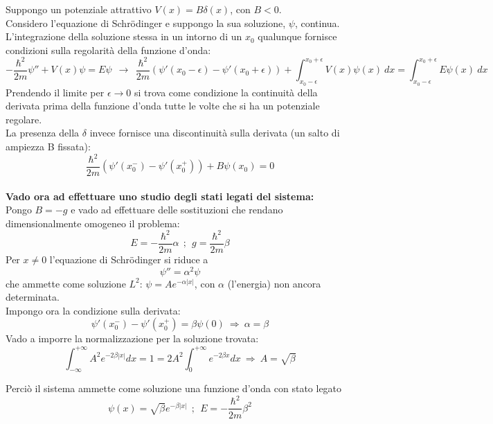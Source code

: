 \documentclass[twoside]{article}
\begin{document}
Suppongo un potenziale attrattivo $V(x)=B\delta(x)$, con $B<0$.
\\
Considero l'equazione di Schr\"odinger e suppongo la sua soluzione, $\psi$, continua. L'integrazione della soluzione stessa in un intorno di un $x_0$ qualunque fornisce condizioni sulla regolarità della funzione d'onda:
\begin{equation}
    -\frac{\hbar^2}{2m}\psi'' +V(x)\psi=E\psi \ \ \rightarrow \ \  \frac{\hbar^2}{2m}(\psi'(x_0-\epsilon)-\psi'(x_0+\epsilon)) +\int_{x_0-\epsilon}^{x_0+\epsilon}V(x)\psi(x) \ dx= \int_{x_0-\epsilon}^{x_0+\epsilon}E\psi(x) \ dx 
\end{equation}
Prendendo il limite per $\epsilon \rightarrow 0$ si trova come condizione la continuità della derivata prima della funzione d'onda tutte le volte che si ha un potenziale regolare.
\\
La presenza della $\delta$ invece fornisce una discontinuità sulla derivata (un salto di ampiezza B fissata):
\begin{equation}
    \frac{\hbar^2}{2m}(\psi'(x_0 ^-)-\psi'(x_0 ^+)) + B\psi(x_0)=0
\end{equation}
\\
\textbf{Vado ora ad effettuare uno studio degli stati legati del sistema:}
\\
Pongo $B=-g$ e vado ad effettuare delle sostituzioni che rendano dimensionalmente omogeneo il problema:
\begin{equation}
    E=-\frac{\hbar^2}{2m}\alpha \ \ ; \ \ g=\frac{\hbar^2}{2m}\beta
\end{equation}
Per $x\neq0$ l'equazione di Schr\"odinger si riduce a 
\begin{equation}
    \psi''=\alpha^2\psi
\end{equation}
che ammette come soluzione $L^2$: $\psi=Ae^{-\alpha|x|}$, con $\alpha$ (l'energia) non ancora determinata.
\\
Impongo ora la condizione sulla derivata:
\begin{equation}
     \psi'(x_0 ^-)-\psi'(x_0 ^+)=\beta\psi(0) \ \Rightarrow \ \alpha=\beta
\end{equation}
Vado a imporre la normalizzazione per la soluzione trovata:
\begin{equation}
    \int_{-\infty}^{+\infty} A^2e^{-2\beta|x|}dx=1=2A^2\int_{0}^{+\infty}e^{-2\beta x}dx \ \Rightarrow \ A=\sqrt{\beta}
\end{equation}

Perciò il sistema ammette come soluzione una funzione d'onda con stato legato
\begin{equation}
    \psi(x)=\sqrt{\beta}e^{-\beta|x|} \ \ ; \ \ E=-\frac{\hbar^2}{2m}\beta^2
\end{equation}
\end{document}
